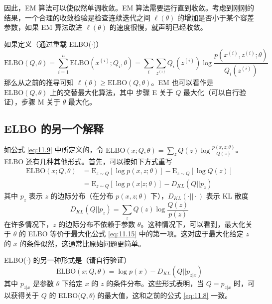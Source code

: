 因此，EM 算法可以使似然单调收敛。EM 算法需要运行直到收敛。考虑到刚刚的结果，一个合理的收敛检验是检查连续迭代之间 $\ell(\theta)$ 的增加是否小于某个容差参数，如果 EM 算法改进 $\ell(\theta)$ 的速度很慢，就声明已经收敛。

\begin{remark*}
    如果定义（通过重载 ELBO($\cdot$)）
    \begin{equation}
        \text{ELBO}(Q, \theta) = \sum_{i=1}^n \text{ELBO}(x^{(i)}; Q_i, \theta) = \sum_i \sum_{z^{(i)}} Q_i(z^{(i)}) \log \frac{p(x^{(i)}, z^{(i)}; \theta)}{Q_i(z^{(i)})}
        \label{eq:11.14}
    \end{equation}
    那么从之前的推导可知 $\ell(\theta) \geq \text{ELBO}(Q, \theta)$。EM 也可以看作是 $\text{ELBO}(Q, \theta)$ 上的交替最大化算法，其中 步骤 E 关于 $Q$ 最大化（可以自行验证），步骤 M 关于 $\theta$ 最大化。
\end{remark*}

\subsection{ELBO 的另一个解释}

如公式 \eqref{eq:11.9} 中所定义的，令 $\text{ELBO}(x; Q, \theta) = \sum_z Q(z) \log \frac{p(x, z; \theta)}{Q(z)}$。ELBO 还有几种其他形式。首先，可以按如下方式重写
\begin{align}
    \text{ELBO}(x; Q, \theta) &= \text{E}_{z \sim Q}[\log p(x, z; \theta)] - \text{E}_{z \sim Q}[\log Q(z)] \nonumber \\
    &= \text{E}_{z \sim Q}[\log p(x|z; \theta)] - D_{KL}(Q||p_z)
    \label{eq:11.15}
\end{align}
其中 $p_z$ 表示 $z$ 的边际分布（在分布 $p(x, z; \theta)$ 下），$D_{KL}(\cdot||\cdot)$ 表示 KL 散度
\begin{equation}
    D_{KL}(Q||p_z) = \sum_z Q(z) \log \frac{Q(z)}{p(z)}
    \label{eq:11.16}
\end{equation}
在许多情况下，$z$ 的边际分布不依赖于参数 $\theta$。这种情况下，可以看到，最大化关于 $\theta$ 的 ELBO 等价于最大化公式 \eqref{eq:11.15} 中的第一项。这对应于最大化给定 $z$ 的 $x$ 的条件似然，这通常比原始问题更简单。

ELBO($\cdot$) 的另一种形式是（请自行验证）
\begin{equation}
    \text{ELBO}(x; Q, \theta) = \log p(x) - D_{KL}(Q||p_{z|x})
    \label{eq:11.17}
\end{equation}
其中 $p_{z|x}$ 是参数 $\theta$ 下给定 $x$ 的 $z$ 的条件分布。这些形式表明，当 $Q = p_{z|x}$ 时，可以获得关于 $Q$ 的 ELBO($Q, \theta$) 的最大值，这和之前的公式 \eqref{eq:11.8} 一致。

